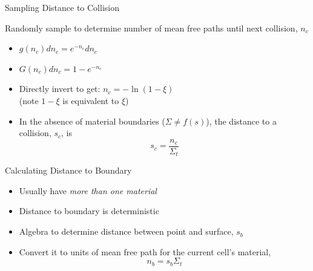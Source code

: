 \documentclass[xcolor=x11names,compress]{beamer}
\renewcommand{\(}{\begin{columns}}
\renewcommand{\)}{\end{columns}}
\newcommand{\<}[1]{\begin{column}{#1}}
\renewcommand{\>}{\end{column}}
\begin{document}
\begin{frame}{Sampling Distance to Collision}

Randomly sample to determine number of mean free paths until next collision, $n_c$

\begin{itemize}
  \item $g(n_c) dn_c = e^{-n_c} dn_c$ 
  \vspace{.5em}
  \item $G(n_c) dn_c = 1 - e^{-n_c}$ 
  \vspace{.5em}
  \item Directly invert to get: $\boxed{n_c = - \ln(1 - \xi)}$ \\
   \hspace*{1.5em} (note $1-\xi$ is equivalent to $\xi$)
  \vspace{.5em}
  \item In the absence of material boundaries ($\Sigma \neq f(s)$), the distance to a collision, $s_c$, is
  \[s_c = \frac{n_c}{\Sigma_t}\]
\end{itemize}

\end{frame}


\begin{frame}{Calculating Distance to Boundary}

\begin{itemize}
  \item Usually have \textit{more than one material}
  \vspace*{1 em}
  \item Distance to boundary is deterministic
  \vspace*{1 em}
  \item Algebra to determine distance between point and surface, $s_b$
  \vspace*{1 em}
  \item Convert it to units of mean free path for the current cell's material, 
  \[n_b = s_b \Sigma_t\] 
\end{itemize}

\end{frame}
\end{document}
